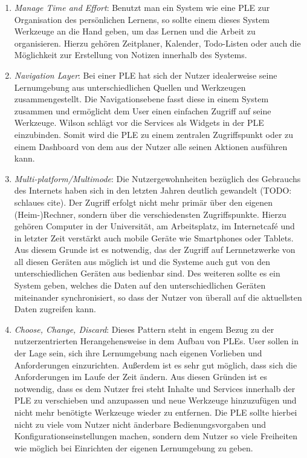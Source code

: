 \begin{enumerate}
 \item \emph{Manage Time and Effort}\label{wilson_patterns:manage_time_effort}: Benutzt man ein System wie eine PLE zur Organisation des persönlichen Lernens, so sollte einem dieses System Werkzeuge an die Hand geben, um das Lernen und die Arbeit zu organisieren. Hierzu gehören Zeitplaner, Kalender, Todo-Listen oder auch die Möglichkeit zur Erstellung von Notizen innerhalb des Systems.
 \item \emph{Navigation Layer}\label{wilson_patterns:navigation_layer}: Bei einer PLE hat sich der Nutzer idealerweise seine Lernumgebung aus unterschiedlichen Quellen und Werkzeugen zusammengestellt. Die Navigationsebene fasst diese in einem System zusammen und ermöglicht dem User einen einfachen Zugriff auf seine Werkzeuge. Wilson schlägt vor die Services als Widgets in der PLE einzubinden. Somit wird die PLE zu einem zentralen Zugriffspunkt oder zu einem Dashboard von dem aus der Nutzer alle seinen Aktionen ausführen kann. 
 \item \emph{Multi-platform/Multimode}\label{wilson_patterns:multimode}: Die Nutzergewohnheiten bezüglich des Gebrauchs des Internets haben sich in den letzten Jahren deutlich gewandelt (TODO: schlaues cite). Der Zugriff erfolgt nicht mehr primär über den eigenen (Heim-)Rechner, sondern über die verschiedensten Zugriffspunkte. Hierzu gehören Computer in der Universität, am Arbeitsplatz, im Internetcafé und in letzter Zeit verstärkt auch mobile Geräte wie Smartphones oder Tablets. Aus diesem Grunde ist es notwendig, das der Zugriff auf Lernnetzwerke von all diesen Geräten aus möglich ist und die Systeme auch gut von den unterschiedlichen Geräten aus bedienbar sind. Des weiteren sollte es ein System geben, welches die Daten auf den unterschiedlichen Geräten miteinander synchronisiert, so dass der Nutzer von überall auf die aktuellsten Daten zugreifen kann.
 \item \emph{Choose, Change, Discard}\label{wilson_patterns:choose_change_discard}: Dieses Pattern steht in engem Bezug zu der nutzerzentrierten Herangehensweise in dem Aufbau von PLEs. User sollen in der Lage sein, sich ihre Lernumgebung nach eigenen Vorlieben und Anforderungen einzurichten. Außerdem ist es sehr gut möglich, dass sich die Anforderungen im Laufe der Zeit ändern. Aus diesen Gründen ist es notwendig, dass es dem Nutzer frei steht Inhalte und Services innerhalb der PLE zu verschieben und anzupassen und neue Werkzeuge hinzuzufügen und nicht mehr benötigte Werkzeuge wieder zu entfernen. Die PLE sollte hierbei nicht zu viele vom Nutzer nicht änderbare Bedienungsvorgaben und Konfigurationseinstellungen machen, sondern dem Nutzer so viele Freiheiten wie möglich bei Einrichten der eigenen Lernumgebung zu geben.
\end{enumerate}

